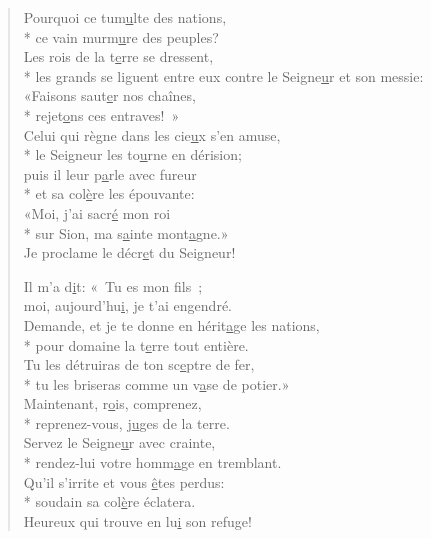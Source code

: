 \begin{verse}
Pourquoi ce tum\underline{u}lte des nations, \\*
ce vain murm\underline{u}re des peuples? \\
Les rois de la t\underline{e}rre se dressent, \\*
les grands se liguent entre eux
contre le Seigne\underline{u}r et son messie: \\
«Faisons saut\underline{e}r nos chaînes, \\*
rejet\underline{o}ns ces entraves! » \\

Celui qui règne dans les cie\underline{u}x s’en amuse, \\*
le Seigneur les to\underline{u}rne en dérision; \\
puis il leur p\underline{a}rle avec fureur \\*
et sa col\underline{è}re les épouvante: \\
«Moi, j’ai sacr\underline{é} mon roi \\*
sur Sion, ma s\underline{a}inte mont\underline{a}gne.» \\

Je proclame le décr\underline{e}t du Seigneur!~\psalmdagger

Il m’a d\underline{i}t: « Tu es mon fils ; \\
moi, aujourd’hu\underline{i}, je t’ai engendré. \\
Demande, et je te donne en hérit\underline{a}ge les nations, \\*
pour domaine la t\underline{e}rre tout entière. \\
Tu les détruiras de ton sc\underline{e}ptre de fer, \\*
tu les briseras comme un v\underline{a}se de potier.» \\

Maintenant, r\underline{o}is, comprenez, \\*
reprenez-vous, j\underline{u}ges de la terre. \\
Servez le Seigne\underline{u}r avec crainte, \\*
rendez-lui votre homm\underline{a}ge en tremblant. \\
Qu’il s’irrite et vous \underline{ê}tes perdus: \\*
soudain sa col\underline{è}re éclatera. \\

Heureux qui trouve en lu\underline{i} son refuge! \\
\end{verse}

